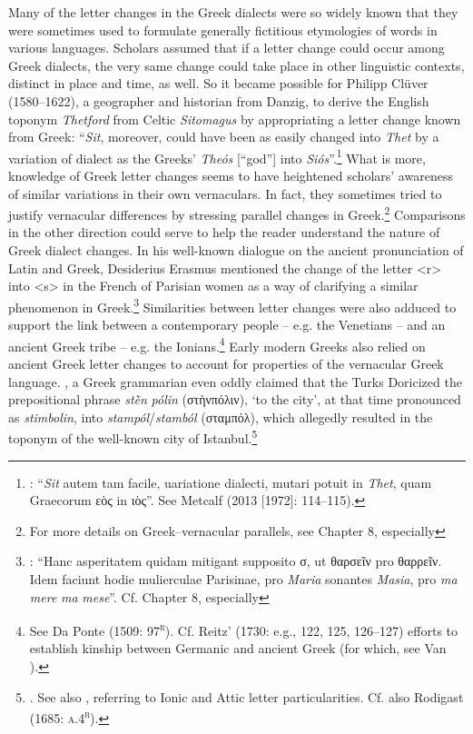 Many of the letter changes in the Greek dialects were so widely known that they were sometimes used to formulate generally fictitious etymologies of words in various languages. Scholars assumed that if a letter change could occur among Greek dialects, the very same change could take place in other linguistic contexts, distinct in place and time, as well. So it became possible for Philipp Clüver (1580–1622), a geographer and historian from Danzig, to derive the English toponym \textit{Thetford} from Celtic \textit{Sitomagus} by appropriating a letter change known from Greek: “\textit{Sit}, moreover, could have been as easily changed into \textit{Thet} by a variation of dialect as the Greeks’ \textit{Theós} [“god”] into \textit{Siós}”.\footnote{ \textrm{\citet[64]{Clüver1616}: “}\textrm{\textit{Sit}} \textrm{autem tam facile, uariatione dialecti, mutari potuit in} \textrm{\textit{Thet}}\textrm{, quam Graecorum \Theta εὸς in \Sigma ιὸς”. See Metcalf (2013 [1972]: 114–115).}} What is more, knowledge of Greek letter changes seems to have heightened scholars’ awareness of similar variations in their own vernaculars. In fact, they sometimes tried to justify vernacular differences by stressing parallel changes in Greek.\footnote{ \textrm{For more details on Greek–vernacular parallels, see Chapter 8, especially }} Comparisons in the other direction could serve to help the reader understand the nature of Greek dialect changes. In his well-known dialogue on the ancient pronunciation of Latin and Greek, Desiderius Erasmus mentioned the change of the letter <r> into <s> in the French of Parisian women as a way of clarifying a similar phenomenon in Greek.\footnote{ \textrm{\citet[52]{Erasmus1528}: “Hanc asperitatem quidam mitigant supposito σ, ut θαρσεῖν pro θαρρεῖν. Idem faciunt hodie mulierculae Parisinae, pro} \textrm{\textit{Maria}} \textrm{sonantes} \textrm{\textit{Masia}}\textrm{, pro} \textrm{\textit{ma} \textit{mere} \textit{ma} \textit{mese}}\textrm{”. Cf. Chapter 8, especially }} Similarities between letter changes were also adduced to support the link between a contemporary people – e.g. the Venetians – and an ancient Greek tribe – e.g. the Ionians.\footnote{ \textrm{See Da Ponte (1509: 97}\textrm{\textsc{\textsuperscript{r}}}\textrm{). Cf. Reitz’ (1730: e.g., 122, 125, 126–127) efforts to establish kinship between Germanic and ancient Greek (for which, see Van \citealt{Hal2016}).}} Early modern Greeks also relied on ancient Greek letter changes to account for properties of the vernacular Greek language. \citealt{Around1650}, a Greek grammarian even oddly claimed that the Turks Doricized the prepositional phrase \textit{stḕn} \textit{pólin} (στὴνπόλιν), ‘to the city’, at that time pronounced as \textit{stimbolin}, into \textit{stampól}/\textit{stamból} (σταμπόλ), which allegedly resulted in the toponym of the well-known city of Istanbul.\footnote{ \textrm{\citet[14]{Nikiforos1908}. See also \citet[35]{Nikiforos1908}, referring to Ionic and Attic letter particularities. Cf.} also Rodigast (1685: \textsc{a.4}\textsc{\textsuperscript{r}}).}

